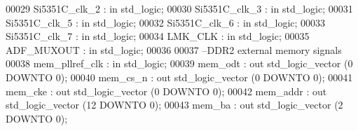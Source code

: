 \begin{DoxyCode}
00029       \textcolor{vhdlchar}{Si5351C_clk_2}        \textcolor{vhdlchar}{:} \textcolor{keywordflow}{in} \textcolor{comment}{std\_logic};
00030       \textcolor{vhdlchar}{Si5351C_clk_3}        \textcolor{vhdlchar}{:} \textcolor{keywordflow}{in} \textcolor{comment}{std\_logic};
00031       \textcolor{vhdlchar}{Si5351C_clk_5}        \textcolor{vhdlchar}{:} \textcolor{keywordflow}{in} \textcolor{comment}{std\_logic};
00032       \textcolor{vhdlchar}{Si5351C_clk_6}        \textcolor{vhdlchar}{:} \textcolor{keywordflow}{in} \textcolor{comment}{std\_logic};
00033       \textcolor{vhdlchar}{Si5351C_clk_7}        \textcolor{vhdlchar}{:} \textcolor{keywordflow}{in} \textcolor{comment}{std\_logic};
00034       \textcolor{vhdlchar}{LMK_CLK}              \textcolor{vhdlchar}{:} \textcolor{keywordflow}{in} \textcolor{comment}{std\_logic};
00035       \textcolor{vhdlchar}{ADF_MUXOUT}           \textcolor{vhdlchar}{:} \textcolor{keywordflow}{in} \textcolor{comment}{std\_logic};
00036       
00037 \textcolor{keyword}{      --DDR2 external memory signals    }
00038       \textcolor{vhdlchar}{mem_pllref_clk}       \textcolor{vhdlchar}{:} \textcolor{keywordflow}{in} \textcolor{comment}{std\_logic};
00039       \textcolor{vhdlchar}{mem_odt}              \textcolor{vhdlchar}{:} \textcolor{keywordflow}{out} \textcolor{comment}{std\_logic\_vector} \textcolor{vhdlchar}{(}\textcolor{vhdllogic}{}\textcolor{vhdllogic}{0} \textcolor{keywordflow}{DOWNTO} \textcolor{vhdllogic}{}\textcolor{vhdllogic}{0}\textcolor{vhdlchar}{)};
00040       \textcolor{vhdlchar}{mem_cs_n}             \textcolor{vhdlchar}{:} \textcolor{keywordflow}{out} \textcolor{comment}{std\_logic\_vector} \textcolor{vhdlchar}{(}\textcolor{vhdllogic}{}\textcolor{vhdllogic}{0} \textcolor{keywordflow}{DOWNTO} \textcolor{vhdllogic}{}\textcolor{vhdllogic}{0}\textcolor{vhdlchar}{)};
00041       \textcolor{vhdlchar}{mem_cke}              \textcolor{vhdlchar}{:} \textcolor{keywordflow}{out} \textcolor{comment}{std\_logic\_vector} \textcolor{vhdlchar}{(}\textcolor{vhdllogic}{}\textcolor{vhdllogic}{0} \textcolor{keywordflow}{DOWNTO} \textcolor{vhdllogic}{}\textcolor{vhdllogic}{0}\textcolor{vhdlchar}{)};
00042       \textcolor{vhdlchar}{mem_addr}             \textcolor{vhdlchar}{:} \textcolor{keywordflow}{out} \textcolor{comment}{std\_logic\_vector} \textcolor{vhdlchar}{(}\textcolor{vhdllogic}{}\textcolor{vhdllogic}{12} \textcolor{keywordflow}{DOWNTO} \textcolor{vhdllogic}{}\textcolor{vhdllogic}{0}\textcolor{vhdlchar}{)};
00043       \textcolor{vhdlchar}{mem_ba}               \textcolor{vhdlchar}{:} \textcolor{keywordflow}{out} \textcolor{comment}{std\_logic\_vector} \textcolor{vhdlchar}{(}\textcolor{vhdllogic}{}\textcolor{vhdllogic}{2} \textcolor{keywordflow}{DOWNTO} \textcolor{vhdllogic}{}\textcolor{vhdllogic}{0}\textcolor{vhdlchar}{)};

\end{DoxyCode}

